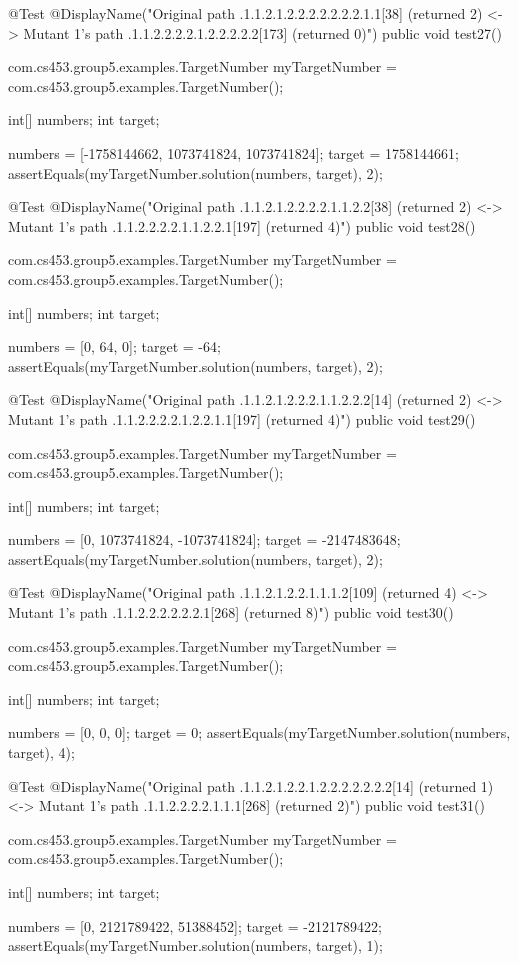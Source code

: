 @Test
@DisplayName("Original path .1.1.2.1.2.2.2.2.2.2.2.1.1[38] (returned 2) <-> Mutant 1's path .1.1.2.2.2.2.1.2.2.2.2.2[173] (returned 0)")
public void test27() {
    com.cs453.group5.examples.TargetNumber myTargetNumber = com.cs453.group5.examples.TargetNumber();

    int[] numbers;
    int target;

    numbers = [-1758144662, 1073741824, 1073741824];
    target = 1758144661;
    assertEquals(myTargetNumber.solution(numbers, target), 2);
}

@Test
@DisplayName("Original path .1.1.2.1.2.2.2.2.1.1.2.2[38] (returned 2) <-> Mutant 1's path .1.1.2.2.2.2.1.1.2.2.1[197] (returned 4)")
public void test28() {
    com.cs453.group5.examples.TargetNumber myTargetNumber = com.cs453.group5.examples.TargetNumber();

    int[] numbers;
    int target;

    numbers = [0, 64, 0];
    target = -64;
    assertEquals(myTargetNumber.solution(numbers, target), 2);
}

@Test
@DisplayName("Original path .1.1.2.1.2.2.2.1.1.2.2.2[14] (returned 2) <-> Mutant 1's path .1.1.2.2.2.2.1.2.2.1.1[197] (returned 4)")
public void test29() {
    com.cs453.group5.examples.TargetNumber myTargetNumber = com.cs453.group5.examples.TargetNumber();

    int[] numbers;
    int target;

    numbers = [0, 1073741824, -1073741824];
    target = -2147483648;
    assertEquals(myTargetNumber.solution(numbers, target), 2);
}

@Test
@DisplayName("Original path .1.1.2.1.2.2.1.1.1.2[109] (returned 4) <-> Mutant 1's path .1.1.2.2.2.2.2.2.1[268] (returned 8)")
public void test30() {
    com.cs453.group5.examples.TargetNumber myTargetNumber = com.cs453.group5.examples.TargetNumber();

    int[] numbers;
    int target;

    numbers = [0, 0, 0];
    target = 0;
    assertEquals(myTargetNumber.solution(numbers, target), 4);
}

@Test
@DisplayName("Original path .1.1.2.1.2.2.1.2.2.2.2.2.2.2[14] (returned 1) <-> Mutant 1's path .1.1.2.2.2.2.1.1.1[268] (returned 2)")
public void test31() {
    com.cs453.group5.examples.TargetNumber myTargetNumber = com.cs453.group5.examples.TargetNumber();

    int[] numbers;
    int target;

    numbers = [0, 2121789422, 51388452];
    target = -2121789422;
    assertEquals(myTargetNumber.solution(numbers, target), 1);
}

